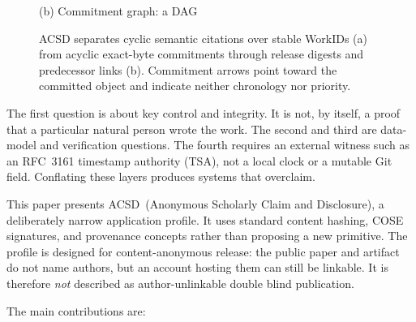 \documentclass[11pt]{article}
\newcommand{\acsd}{\textsc{ACSD}}
\begin{document}
\begin{figure}[t]
\begin{minipage}[t]{0.57\linewidth}
\par\smallskip
{\small (b) Commitment graph: a DAG}\par
\end{minipage}

\caption{ACSD separates cyclic semantic citations over stable WorkIDs (a) from
acyclic exact-byte commitments through release digests and predecessor links
(b). Commitment arrows point toward the committed object and indicate neither
chronology nor priority.}
\label{fig:two-graphs}
\end{figure}

The first question is about key control and integrity. It is not, by itself, a proof that a particular natural person wrote the work. The second and third are data-model and verification questions. The fourth requires an external witness such as an RFC~3161 timestamp authority (TSA), not a local clock or a mutable Git field. Conflating these layers produces systems that overclaim.

This paper presents \acsd\ (Anonymous Scholarly Claim and Disclosure), a deliberately narrow application profile. It uses standard content hashing, COSE signatures, and provenance concepts rather than proposing a new primitive. The profile is designed for content-anonymous release: the public paper and artifact do not name authors, but an account hosting them can still be linkable. It is therefore \emph{not} described as author-unlinkable double blind publication.

The main contributions are:
\end{document}
